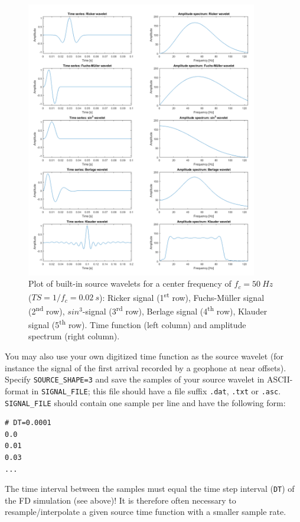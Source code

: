 \begin{figure}
\centering
    \includegraphics[width=0.9\textwidth]{figures/signals.png}
    \caption{Plot of built-in source wavelets for a center frequency of $f_c=\SI{50}{Hz}$ ($TS=1/f_c=\SI{0.02}{s}$): Ricker signal (1\textsuperscript{st} row), Fuchs-M\"uller signal (2\textsuperscript{nd} row), $sin^3$-signal (3\textsuperscript{rd} row), Berlage signal (4\textsuperscript{th} row), Klauder signal (5\textsuperscript{th} row). Time function (left column) and amplitude spectrum (right column).}
\label{fig_source_wavelets}
\end{figure}

You may also use your own digitized time function as the source wavelet (for instance the signal of the first arrival recorded by a geophone at near offsets). Specify \texttt{SOURCE\_SHAPE=3} and save the samples of your source wavelet in ASCII-format in \texttt{SIGNAL\_FILE}; this file should have a file suffix \texttt{.dat}, \texttt{.txt} or \texttt{.asc}. \texttt{SIGNAL\_FILE} should contain one sample per line and have the following form:
\begin{verbatim}
# DT=0.0001
0.0
0.01
0.03
...
\end{verbatim}

The time interval between the samples must equal the time step interval (\texttt{DT}) of the FD simulation (see above)! It is therefore often necessary to resample/interpolate a given source time function with a smaller sample rate.

